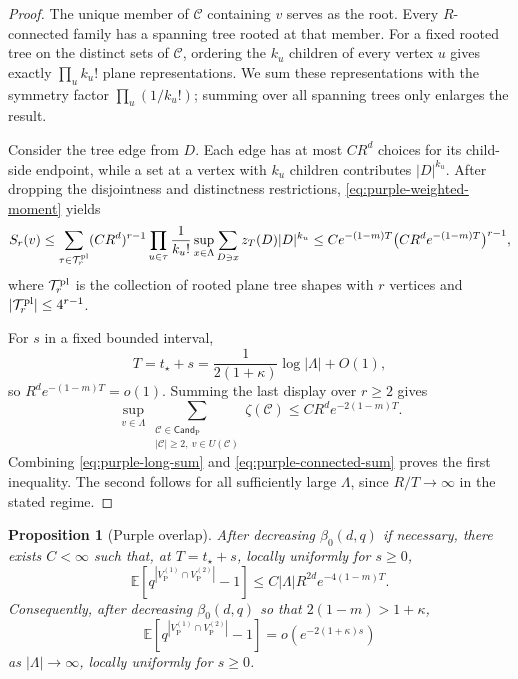\documentclass[letterpaper,11pt,reqno]{amsart}
\newtheorem{prop}[thm]{Proposition}
\theoremstyle{definition}
\begin{document}
\begin{proof}
The unique member of \(\mathcal C\) containing \(v\) serves as the root.
Every \(R\)-connected family has a spanning tree rooted at that member. For a
fixed rooted tree on the distinct sets of \(\mathcal C\), ordering the
\(k_u\) children of every vertex \(u\) gives exactly \(\prod_u k_u!\) plane
representations. We sum these representations with the symmetry factor
\(\prod_u(1/k_u!)\); summing over all spanning trees only enlarges the
result.

Consider the tree edge from $D$. 
Each edge has at most \(CR^d\) choices for its child-side endpoint,
while a set at a vertex with \(k_u\) children contributes
\(|D|^{k_u}\). After dropping the disjointness and distinctness restrictions,
\eqref{eq:purple-weighted-moment} yields
\[
\begin{aligned}
        S_r(v)
        \le
        \sum_{\tau\in\mathcal T_r^{\rm pl}}
        (CR^d)^{r-1}
        \prod_{u\in\tau}
        \frac{1}{k_u!}
        \sup_{x\in\Lambda}
        \sum_{D\ni x}z_T(D)|D|^{k_u}
        \le
        Ce^{-(1-m)T}\bigl(CR^de^{-(1-m)T}\bigr)^{r-1},
\end{aligned}
\]
where \(\mathcal T_r^{\rm pl}\) is the collection of rooted plane tree
shapes with \(r\) vertices and
\(|\mathcal T_r^{\rm pl}|\le4^{r-1}\).

For \(s\) in a fixed bounded interval,
\[
        T=t_\star+s
        =
        \frac{1}{2(1+\kappa)}\log|\Lambda|+O(1),
\]
so \(R^d e^{-(1-m)T}=o(1)\). Summing the last display over \(r\ge2\) gives
\begin{equation}
\label{eq:purple-connected-sum}
        \sup_{v\in\Lambda}
        \sum_{\substack{\mathcal C\in\mathsf{Cand}_{\mathrm P}\\
                        |\mathcal C|\ge2,\ v\in U(\mathcal C)}}
        \zeta(\mathcal C)
        \le
        CR^de^{-2(1-m)T}.
\end{equation}
Combining \eqref{eq:purple-long-sum} and
\eqref{eq:purple-connected-sum} proves the first inequality. The second
follows for all sufficiently large \(\Lambda\), since \(R/T\to\infty\) in
the stated regime.
\end{proof}



\begin{prop}[Purple overlap]
\label{prop:purple}
After decreasing \(\beta_0(d,q)\) if necessary, there exists
\(C<\infty\) such that, at \(T=t_\star+s\), locally uniformly for
\(s\ge0\),
\[
        \mathbb E\left[
        q^{|V_{\mathrm{P}}^{(1)}\cap V_{\mathrm{P}}^{(2)}|}-1
        \right]
        \le
        C|\Lambda|R^{2d}e^{-4(1-m) T}.
\]
Consequently, after decreasing \(\beta_0(d,q)\) so that
\(2(1-m)>1+\kappa\),
\[
        \mathbb E\left[
        q^{|V_{\mathrm{P}}^{(1)}\cap V_{\mathrm{P}}^{(2)}|}-1
        \right]
        =
        o\left(e^{-2(1+\kappa) s}\right)
\]
as \(|\Lambda|\to\infty\), locally uniformly for \(s\ge0\).
\end{prop}
\end{document}
